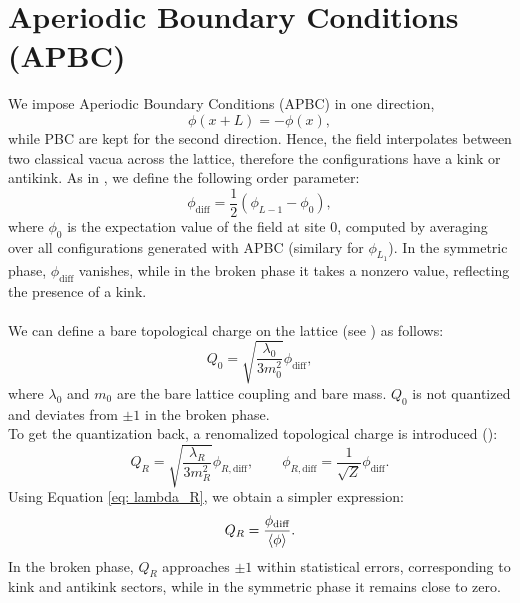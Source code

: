 \section{Aperiodic Boundary Conditions (APBC)}
We impose Aperiodic Boundary Conditions (APBC) in one direction, 
\begin{equation}
    \phi(x + L) = -\phi(x), 
\end{equation}
while PBC are kept for the second direction. Hence, the field interpolates between two classical vacua
across the lattice, therefore the configurations have a kink or antikink. As in \cite{De_2005}, we define the 
following order parameter: 
\begin{equation}
    \phi_\text{diff} = \frac{1}{2}\left( \phi_{L-1} - \phi_0 \right), 
\end{equation}
where $\phi_0$ is the expectation value of the field at site $0$, computed by averaging over all configurations
generated with APBC (similary for $\phi_{L_1}$). In the symmetric phase,
$\phi_{\text{diff}}$ vanishes, while in the broken phase it takes a nonzero value, reflecting the presence of a kink.
\\\\
We can define a bare topological charge on the lattice (see \cite{De_2005}) as follows: 
\begin{equation}
    Q_0 = \sqrt{\frac{\lambda_0}{3 m_0^2}}\phi_{\text{diff}}, 
\end{equation}
where $\lambda_0$ and $m_0$ are the bare lattice coupling and bare mass. $Q_0$ is not quantized and deviates from $\pm 1$ in the broken phase. 
\\
To get the quantization back, a renomalized topological charge is introduced (\cite{De_2005}): 
\begin{equation}
    Q_R = \sqrt{\frac{\lambda_R}{3m_R^2}}\phi_{R, \text{diff}}, \qquad \phi_{R, \text{diff}} = \frac{1}{\sqrt{Z}}\phi_{\text{diff}}. 
\end{equation}
Using Equation \ref{eq: lambda_R}, we obtain a simpler expression: 
\begin{equation}
    Q_R = \frac{\phi_{\text{diff}}}{\braket{\phi}}. 
\end{equation}
In the broken phase, $Q_R$ approaches $\pm 1$ within statistical errors,
corresponding to kink and antikink sectors, while in the symmetric phase it
remains close to zero. 